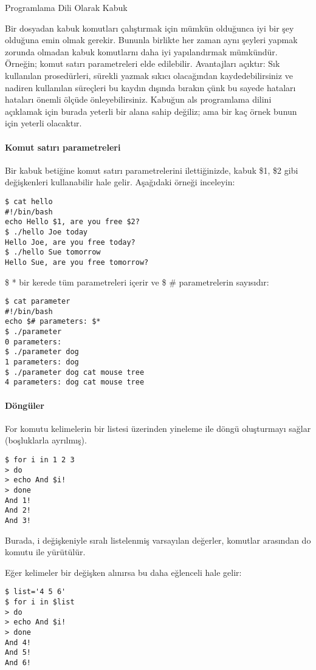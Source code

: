 \begin{section}{Programlama Dili Olarak Kabuk}

Bir dosyadan kabuk komutları çalıştırmak için mümkün olduğunca iyi bir şey olduğuna emin olmak gerekir. Bununla birlikte her zaman aynı şeyleri yapmak zorunda olmadan kabuk komutlarnı daha iyi yapılandırmak mümkündür. Örneğin; komut satırı parametreleri elde edilebilir. Avantajları açıktır: Sık kullanılan prosedürleri, sürekli yazmak sıkıcı olacağından kaydedebilirsiniz ve nadiren kullanılan süreçleri bu kaydın dışında bırakın çünk bu sayede hataları hataları önemli ölçüde önleyebilirsiniz. Kabuğun als programlama dilini açıklamak için burada yeterli bir alana sahip değiliz; ama bir kaç örnek bunun için yeterli olacaktır.

\paragraph{Komut satırı parametreleri}{Bir kabuk betiğine komut satırı parametrelerini ilettiğinizde, kabuk \$1, \$2 gibi değişkenleri kullanabilir hale gelir. Aşağıdaki örneği inceleyin:
\begin{verbatim}
$ cat hello
#!/bin/bash
echo Hello $1, are you free $2?
$ ./hello Joe today
Hello Joe, are you free today?
$ ./hello Sue tomorrow
Hello Sue, are you free tomorrow?
\end{verbatim}
}

\$ * bir kerede tüm parametreleri içerir ve \$ \# parametrelerin sayısıdır:
\begin{verbatim}
$ cat parameter
#!/bin/bash
echo $# parameters: $*
$ ./parameter
0 parameters:
$ ./parameter dog
1 parameters: dog
$ ./parameter dog cat mouse tree
4 parameters: dog cat mouse tree
\end{verbatim}

\paragraph{Döngüler}{For komutu kelimelerin bir listesi üzerinden yineleme ile döngü oluşturmayı sağlar (boşluklarla ayrılmış).
\begin{verbatim}
$ for i in 1 2 3
> do
> echo And $i!
> done
And 1!
And 2!
And 3!
\end{verbatim}
}

Burada, i değişkeniyle sıralı listelenmiş varsayılan değerler, komutlar arasından do komutu ile yürütülür.

Eğer kelimeler bir değişken alınırsa bu daha eğlenceli hale gelir:
\begin{verbatim}
$ list='4 5 6'
$ for i in $list
> do
> echo And $i!
> done
And 4!
And 5!
And 6!
\end{verbatim}


\end{section}
